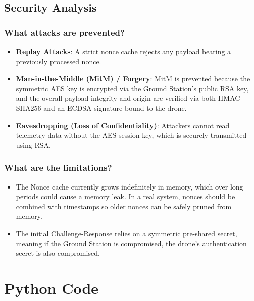 \documentclass[12pt,a4paper]{article}
\begin{document}
\subsection{Security Analysis}
\subsubsection{What attacks are prevented?}
\begin{itemize}
    \item \textbf{Replay Attacks}: A strict nonce cache rejects any payload bearing a previously processed nonce.
    \item \textbf{Man-in-the-Middle (MitM) / Forgery}: MitM is prevented because the symmetric AES key is encrypted via the Ground Station's public RSA key, and the overall payload integrity and origin are verified via both HMAC-SHA256 and an ECDSA signature bound to the drone.
    \item \textbf{Eavesdropping (Loss of Confidentiality)}: Attackers cannot read telemetry data without the AES session key, which is securely transmitted using RSA.
\end{itemize}

\subsubsection{What are the limitations?}
\begin{itemize}
    \item The Nonce cache currently grows indefinitely in memory, which over long periods could cause a memory leak. In a real system, nonces should be combined with timestamps so older nonces can be safely pruned from memory.
    \item The initial Challenge-Response relies on a symmetric pre-shared secret, meaning if the Ground Station is compromised, the drone's authentication secret is also compromised.
\end{itemize}

\newpage
\section{Python Code}
\end{document}
